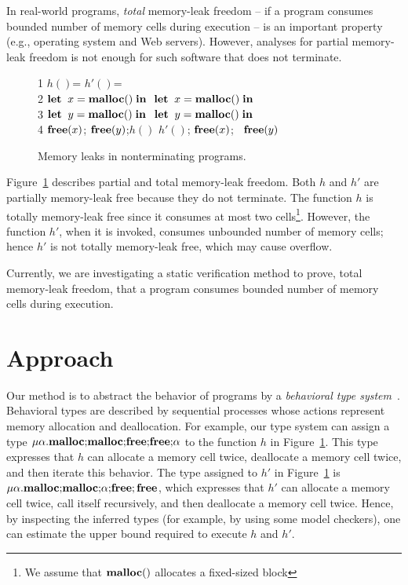 \documentclass{sigplanconf}
\begin{document}
In real-world programs, \emph{total} memory-leak freedom -- if a
program consumes bounded number of memory cells during execution -- is
an important property (e.g., operating system and Web
servers). However, analyses for partial memory-leak freedom is not
enough for such software that does not terminate.

\begin{exmp}\label{ex:ex1}
\begin{figure}[h]
1  \;\;$h()$= \dtb \dtb  \dtb      \dtb          \dtb $h'()$= \\
2  \dtb $\mathbf{let}\; \; x = \mathbf{malloc()}  \; \mathbf{in}\;$ \dtb \;\;\;\;$\mathbf{let}\; \; x = \mathbf{malloc()}  \; \mathbf{in}\;$\\
3  \dtb $\mathbf{let}\; \; y = \mathbf{malloc()}  \; \mathbf{in}\;$ \dtb \;\;\;\; $\mathbf{let}\; \; y = \mathbf{malloc()}  \; \mathbf{in}\;$\\
4  \dtb $\mathbf{free}(x)$; $\mathbf{free}(y) $;\;$h()$ \dtb \;\;\;\;\;\;$h'()$; $\mathbf{free}(x)$; \ $\mathbf{free}(y)$
\caption{Memory leaks in nonterminating programs.}
\label{ex:np}
\end{figure}
Figure~\ref{ex:np} describes partial and total memory-leak freedom.
Both \(h\) and \(h'\) are partially memory-leak free because they do
not terminate. The function \(h\) is totally memory-leak free since it
consumes at most two cells\footnote{We assume that \(\mathbf{malloc()}\)
  allocates a fixed-sized block}.  However, the function \(h'\), when
it is invoked, consumes unbounded number of memory cells; hence \(h'\)
is not totally memory-leak free, which may cause overflow.
\end{exmp}

Currently, we are investigating a static verification method to prove,
total memory-leak freedom, that a program consumes bounded number of
memory cells during execution.

\section{Approach}
Our method is to abstract the behavior of programs by a
\emph{behavioral type
  system}~\cite{DBLP:journals/lmcs/KobayashiSW06,DBLP:journals/tcs/IgarashiK04,DBLP:conf/esop/HondaVK98}.
Behavioral types are described by sequential processes whose actions
represent memory allocation and deallocation. For example, our type
system can assign a type
\(\mu\alpha.\mathbf{malloc};\!\mathbf{malloc};\!\mathbf{free};\!\mathbf{free};\!\alpha\) to
the function \(h\) in Figure~\ref{ex:np}.  This type expresses that
\(h\) can allocate a memory cell twice, deallocate a memory cell
twice, and then iterate this behavior.  The type assigned to \(h'\) in
Figure~\ref{ex:np} is
\(\mu\alpha.\mathbf{malloc};\!\mathbf{malloc};\!\alpha;\!\mathbf{free};\mathbf{free}\), which
expresses that \(h'\) can allocate a memory cell twice, call itself
recursively, and then deallocate a memory cell twice.  Hence, by
inspecting the inferred types (for example, by using some model
checkers), one can estimate the upper bound required to execute \(h\)
and \(h'\).
\end{document}
